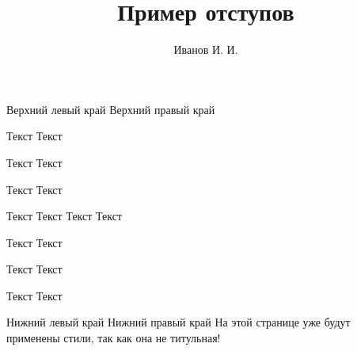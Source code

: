 \documentclass[a4paper, 12pt]{article}
\begin{document}
    \pagestyle{main} %
    \title{Пример отступов}
    \author{Иванов И. И.}
    \maketitle
    \thispagestyle{title} %
    Верхний левый край \hfill Верхний правый край\par
    Текст \hfill Текст\par
    Текст \hfill Текст\par
    Текст \hfill Текст\par
    Текст \hfill Текст
    \vfill
    Текст \hfill Текст\par
    Текст \hfill Текст\par
    Текст \hfill Текст\par
    Текст \hfill Текст\par
    Нижний левый край \hfill Нижний правый край
    \newpage %
    На этой странице уже будут применены стили, так как она не титульная!
\end{document}
